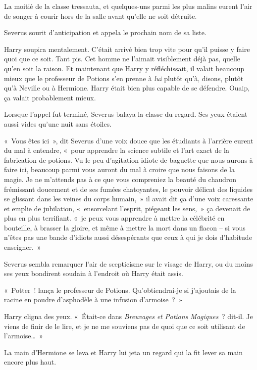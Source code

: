 La moitié de la classe tressauta, et quelques-uns parmi les plus malins eurent l'air de songer à courir hors de la salle avant qu'elle ne soit détruite.

Severus sourit d'anticipation et appela le prochain nom de sa liste.

Harry soupira mentalement. C'était arrivé bien trop vite pour qu'il puisse y faire quoi que ce soit. Tant pis. Cet homme ne l'aimait visiblement déjà pas, quelle qu'en soit la raison. Et maintenant que Harry y réfléchissait, il valait beaucoup mieux que le professeur de Potions s'en prenne à \emph{lui} plutôt qu'à, disons, plutôt qu'à Neville ou à Hermione. Harry était bien plus capable de se défendre. Ouaip, ça valait probablement mieux.

Lorsque l'appel fut terminé, Severus balaya la classe du regard. Ses yeux étaient aussi vides qu'une nuit sans étoiles.

«~Vous êtes ici~», dit Severus d'une voix douce que les étudiants à l'arrière eurent du mal à entendre, «~pour apprendre la science subtile et l'art exact de la fabrication de potions. Vu le peu d'agitation idiote de baguette que nous aurons à faire ici, beaucoup parmi vous auront du mal à croire que nous faisons de la magie. Je ne m'attends pas à ce que vous compreniez la beauté du chaudron frémissant doucement et de ses fumées chatoyantes, le pouvoir délicat des liquides se glissant dans les veines du corps humain,~» il avait dit ça d'une voix caressante et emplie de jubilation, «~ensorcelant l'esprit, piégeant les sens,~» ça devenait de plus en plus terrifiant. «~je peux vous apprendre à mettre la célébrité en bouteille, à brasser la gloire, et même à mettre la mort dans un flacon -- si vous n'êtes pas une bande d'idiots aussi désespérants que ceux à qui je dois d'habitude enseigner.~»

Severus sembla remarquer l'air de scepticisme sur le visage de Harry, ou du moins ses yeux bondirent soudain à l'endroit où Harry était assis.

«~Potter~! lança le professeur de Potions. Qu'obtiendrai-je si j'ajoutais de la racine en poudre d'asphodèle à une infusion d'armoise~?~»

Harry cligna des yeux. «~Était-ce dans \emph{Breuvages et Potions Magiques}~? dit-il. Je viens de finir de le lire, et je ne me souviens pas de quoi que ce soit utilisant de l'armoise…~»

La main d'Hermione se leva et Harry lui jeta un regard qui la fit lever sa main encore plus haut.

